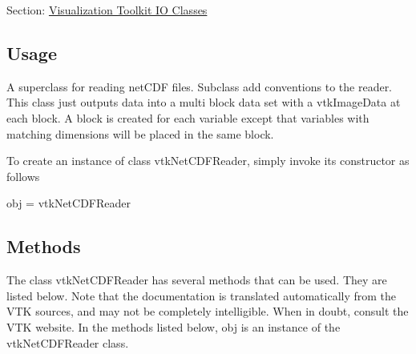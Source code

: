 Section\-: \hyperlink{sec_vtkio}{Visualization Toolkit I\-O Classes} \hypertarget{vtkwidgets_vtkxyplotwidget_Usage}{}\subsection{Usage}\label{vtkwidgets_vtkxyplotwidget_Usage}
A superclass for reading net\-C\-D\-F files. Subclass add conventions to the reader. This class just outputs data into a multi block data set with a vtk\-Image\-Data at each block. A block is created for each variable except that variables with matching dimensions will be placed in the same block.

To create an instance of class vtk\-Net\-C\-D\-F\-Reader, simply invoke its constructor as follows \begin{DoxyVerb}  obj = vtkNetCDFReader
\end{DoxyVerb}
 \hypertarget{vtkwidgets_vtkxyplotwidget_Methods}{}\subsection{Methods}\label{vtkwidgets_vtkxyplotwidget_Methods}
The class vtk\-Net\-C\-D\-F\-Reader has several methods that can be used. They are listed below. Note that the documentation is translated automatically from the V\-T\-K sources, and may not be completely intelligible. When in doubt, consult the V\-T\-K website. In the methods listed below, {\ttfamily obj} is an instance of the vtk\-Net\-C\-D\-F\-Reader class. 
